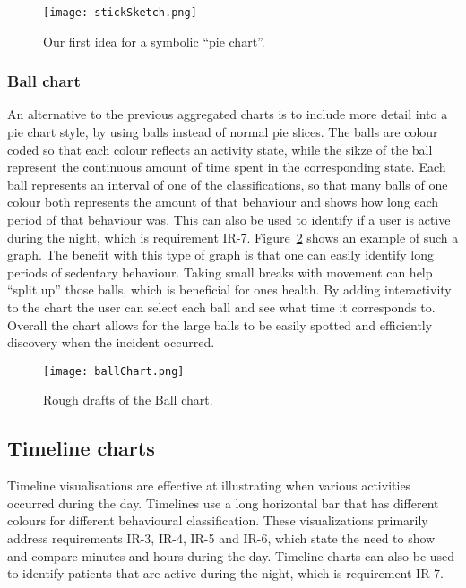\begin{figure}[h!]
	\centering
		\texttt{[image: stickSketch.png]}
		\caption[F2 sketch]{Our first idea for a symbolic ``pie chart''.}
		\label{fig:symbolicPie}
\end{figure}

\subsubsection{Ball chart}
An alternative to the previous aggregated charts is to include more detail into a pie chart style, by using balls instead of normal pie slices. The balls are colour coded so that each colour reflects an activity state, while the sikze of the ball represent the continuous amount of time spent in the corresponding state. Each ball represents an interval of one of the classifications, so that many balls of one colour both represents the amount of that behaviour and shows how long each period of that behaviour was. This can also be used to identify if a user is active during the night, which is requirement IR-7. Figure~\ref{fig:ballChart} shows an example of such a graph. The benefit with this type of graph is that one can easily identify long periods of sedentary behaviour. Taking small breaks with movement can help ``split up'' those balls, which is beneficial for ones health. By adding interactivity to the chart the user can select each ball and see what time it corresponds to. Overall the chart allows for the large balls to be easily spotted and efficiently discovery when the incident occurred.

\begin{figure}[h!]
	\centering
		\texttt{[image: ballChart.png]}
		\caption[F3 sketch]{Rough drafts of the Ball chart.}
		\label{fig:ballChart}
\end{figure}

\subsection{Timeline charts}
Timeline visualisations are effective at illustrating when various activities occurred during the day. Timelines use a long horizontal bar that has different colours for different behavioural classification. These visualizations primarily address requirements IR-3, IR-4, IR-5 and IR-6, which state the need to show and compare minutes and hours during the day. Timeline charts can also be used to identify patients that are active during the night, which is requirement IR-7.

